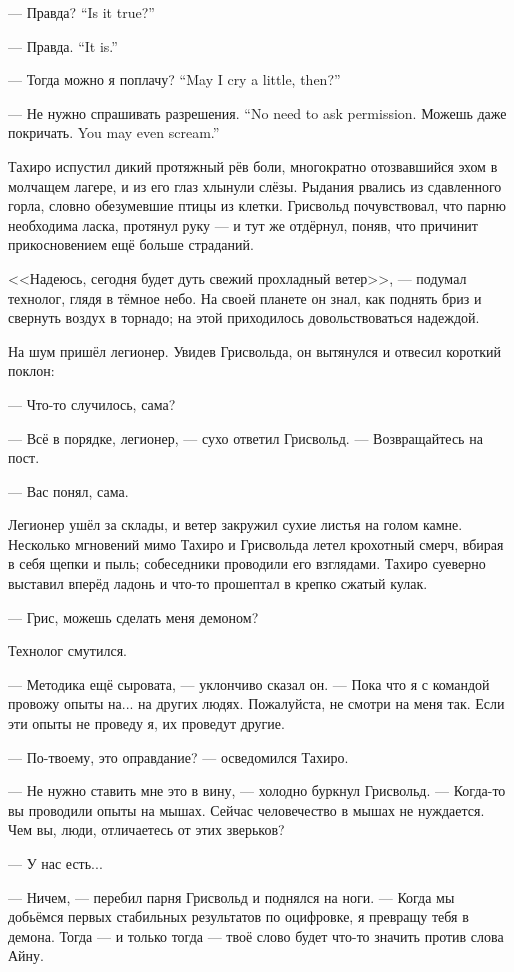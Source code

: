 {--- Правда?}
{``Is it true?''}

{--- Правда.}
{``It is.''}

{--- Тогда можно я поплачу?}
{``May I cry a little, then?''}

{--- Не нужно спрашивать разрешения.}
{``No need to ask permission.}
{Можешь даже покричать.}
{You may even scream.''}

Тахиро испустил дикий протяжный рёв боли, многократно отозвавшийся эхом в молчащем лагере, и из его глаз хлынули слёзы.
Рыдания рвались из сдавленного горла, словно обезумевшие птицы из клетки.
Грисвольд почувствовал, что парню необходима ласка, протянул руку --- и тут же отдёрнул, поняв, что причинит прикосновением ещё больше страданий.

<<Надеюсь, сегодня будет дуть свежий прохладный ветер>>, --- подумал технолог, глядя в тёмное небо.
На своей планете он знал, как поднять бриз и свернуть воздух в торнадо;
на этой приходилось довольствоваться надеждой.

На шум пришёл легионер.
Увидев Грисвольда, он вытянулся и отвесил короткий поклон:

--- Что-то случилось, сама?

--- Всё в порядке, легионер, --- сухо ответил Грисвольд.
--- Возвращайтесь на пост.

--- Вас понял, сама.

Легионер ушёл за склады, и ветер закружил сухие листья на голом камне.
Несколько мгновений мимо Тахиро и Грисвольда летел крохотный смерч, вбирая в себя щепки и пыль;
собеседники проводили его взглядами.
Тахиро суеверно выставил вперёд ладонь и что-то прошептал в крепко сжатый кулак.

--- Грис, можешь сделать меня демоном?

Технолог смутился.

--- Методика ещё сыровата, --- уклончиво сказал он.
--- Пока что я с командой провожу опыты на... на других людях.
Пожалуйста, не смотри на меня так.
Если эти опыты не проведу я, их проведут другие.

--- По-твоему, это оправдание? --- осведомился Тахиро.

--- Не нужно ставить мне это в вину, --- холодно буркнул Грисвольд.
--- Когда-то вы проводили опыты на мышах.
Сейчас человечество в мышах не нуждается.
Чем вы, люди, отличаетесь от этих зверьков?

--- У нас есть...

--- Ничем, --- перебил парня Грисвольд и поднялся на ноги.
--- Когда мы добьёмся первых стабильных результатов по оцифровке, я превращу тебя в демона.
Тогда --- и только тогда --- твоё слово будет что-то значить против слова Айну.

